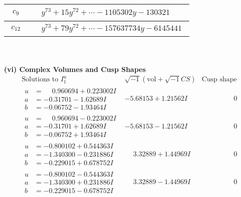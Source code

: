 \documentclass[1p]{elsarticle_modified}
\theoremstyle{definition}
\newcommand{\I}{\sqrt{-1}}
\begin{document}
\begin{tabular}{m{50pt}|m{274pt}}
\hline $$\begin{aligned}c_{9}\end{aligned}$$&$\begin{aligned}
&y^{73}+15 y^{72}+\cdots-1105302 y-130321
\end{aligned}$\\
\hline $$\begin{aligned}c_{12}\end{aligned}$$&$\begin{aligned}
&y^{73}+79 y^{72}+\cdots-157637734 y-6145441
\end{aligned}$\\
\hline
\end{tabular}\\~\\
\newpage\flushleft \textbf{(vi) Complex Volumes and Cusp Shapes}
$$\begin{array}{c|c|c}  
\text{Solutions to }I^u_{1}& \I (\text{vol} + \sqrt{-1}CS) & \text{Cusp shape}\\
 \hline 
\begin{aligned}
u &= \phantom{-}0.960694 + 0.223002 I \\
a &= -0.31701 - 1.62689 I \\
b &= -0.06752 - 1.93464 I\end{aligned}
 & -5.68153 + 1.21562 I & \phantom{-0.000000 } 0 \\ \hline\begin{aligned}
u &= \phantom{-}0.960694 - 0.223002 I \\
a &= -0.31701 + 1.62689 I \\
b &= -0.06752 + 1.93464 I\end{aligned}
 & -5.68153 - 1.21562 I & \phantom{-0.000000 } 0 \\ \hline\begin{aligned}
u &= -0.800102 + 0.544363 I \\
a &= -1.340300 - 0.231886 I \\
b &= -0.229015 + 0.678752 I\end{aligned}
 & \phantom{-}3.32889 + 1.44969 I & \phantom{-0.000000 } 0 \\ \hline\begin{aligned}
u &= -0.800102 - 0.544363 I \\
a &= -1.340300 + 0.231886 I \\
b &= -0.229015 - 0.678752 I\end{aligned}
 & \phantom{-}3.32889 - 1.44969 I & \phantom{-0.000000 } 0 \\ \hline\begin{aligned}

\end{aligned}
\end{array}$$
\end{document}

